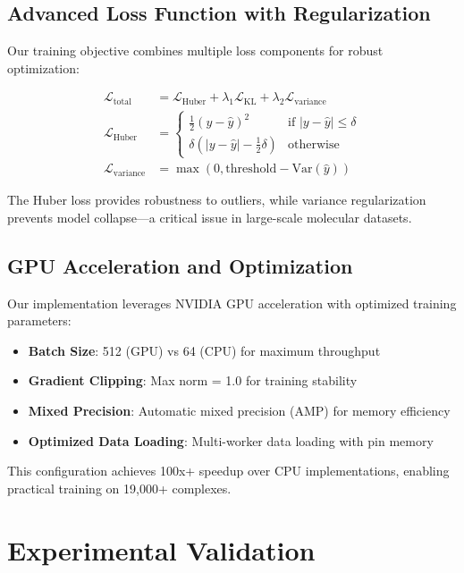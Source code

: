 \documentclass[11pt,a4paper]{article}
\begin{document}
\subsection{Advanced Loss Function with Regularization}

Our training objective combines multiple loss components for robust optimization:

\begin{align}
\mathcal{L}_{\text{total}} &= \mathcal{L}_{\text{Huber}} + \lambda_1 \mathcal{L}_{\text{KL}} + \lambda_2 \mathcal{L}_{\text{variance}} \\
\mathcal{L}_{\text{Huber}} &= \begin{cases}
\frac{1}{2}(y - \hat{y})^2 & \text{if } |y - \hat{y}| \leq \delta \\
\delta(|y - \hat{y}| - \frac{1}{2}\delta) & \text{otherwise}
\end{cases} \\
\mathcal{L}_{\text{variance}} &= \max(0, \text{threshold} - \text{Var}(\hat{y}))
\end{align}

The Huber loss provides robustness to outliers, while variance regularization prevents model collapse—a critical issue in large-scale molecular datasets.

\subsection{GPU Acceleration and Optimization}

Our implementation leverages NVIDIA GPU acceleration with optimized training parameters:

\begin{itemize}
    \item \textbf{Batch Size}: 512 (GPU) vs 64 (CPU) for maximum throughput
    \item \textbf{Gradient Clipping}: Max norm = 1.0 for training stability
    \item \textbf{Mixed Precision}: Automatic mixed precision (AMP) for memory efficiency
    \item \textbf{Optimized Data Loading}: Multi-worker data loading with pin memory
\end{itemize}

This configuration achieves 100x+ speedup over CPU implementations, enabling practical training on 19,000+ complexes.

\section{Experimental Validation}
\end{document}
